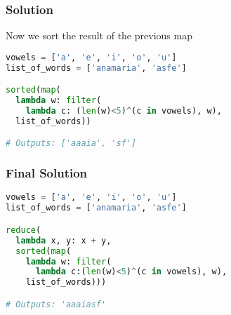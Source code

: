 \documentclass{beamer}
\begin{document}
\begin{frame}[fragile]
\frametitle{Solution}
Now we sort the result of the previous map

\begin{lstlisting}[language=python]
vowels = ['a', 'e', 'i', 'o', 'u']
list_of_words = ['anamaria', 'asfe']

sorted(map(
  lambda w: filter(
    lambda c: (len(w)<5)^(c in vowels), w),
  list_of_words))

# Outputs: ['aaaia', 'sf']
\end{lstlisting}
\end{frame}

\begin{frame}[fragile]
\frametitle{Final Solution}
\begin{lstlisting}[language=python]
vowels = ['a', 'e', 'i', 'o', 'u']
list_of_words = ['anamaria', 'asfe']

reduce(
  lambda x, y: x + y,
  sorted(map(
    lambda w: filter(
      lambda c:(len(w)<5)^(c in vowels), w),
    list_of_words)))

# Outputs: 'aaaiasf'

\end{lstlisting}
\end{frame}
\end{document}
